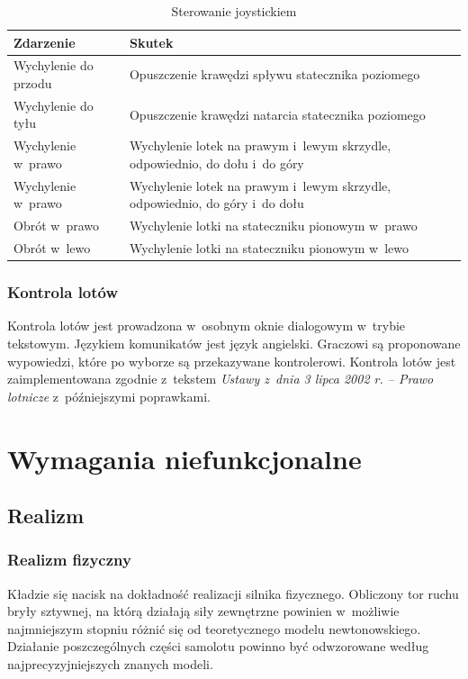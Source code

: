 \documentclass{mwrep}
\begin{document}
\begin{center}
\begin{table}[h]
\begin{center}
\caption{Sterowanie joystickiem}\label{T:Sterowanie_joystickiem}
\vspace{3ex}
\begin{tabularx}{1\textwidth}{|l|X|}
\hline
Zdarzenie & Skutek \\ \hline
Wychylenie do przodu & Opuszczenie krawędzi spływu statecznika poziomego \\
Wychylenie do tyłu & Opuszczenie krawędzi natarcia statecznika poziomego \\
Wychylenie w~prawo & Wychylenie lotek na prawym i~lewym skrzydle, odpowiednio, do dołu i~do góry \\
Wychylenie w~prawo & Wychylenie lotek na prawym i~lewym skrzydle, odpowiednio, do góry i~do dołu \\
Obrót w~prawo & Wychylenie lotki na stateczniku pionowym w~prawo \\
Obrót w~lewo & Wychylenie lotki na stateczniku pionowym w~lewo \\
\hline
\end{tabularx}
\end{center}
\end{table}
\end{center}

\subsection{Kontrola lotów}

Kontrola lotów jest prowadzona w~osobnym oknie dialogowym w~trybie tekstowym. Językiem komunikatów jest język angielski. Graczowi są proponowane wypowiedzi, które po wyborze są przekazywane kontrolerowi. Kontrola lotów jest zaimplementowana zgodnie z~tekstem \emph{Ustawy z~dnia 3 lipca 2002 r. -- Prawo lotnicze} z~późniejszymi poprawkami.

\chapter{Wymagania niefunkcjonalne}

\section{Realizm}
\subsection{Realizm fizyczny}
Kładzie się nacisk na dokładność realizacji silnika fizycznego. Obliczony tor ruchu bryły sztywnej, na którą działają siły zewnętrzne powinien w~możliwie najmniejszym stopniu różnić się od teoretycznego modelu newtonowskiego.\\
Działanie poszczególnych części samolotu powinno być odwzorowane według najprecyzyjniejszych znanych modeli.
\end{document}
